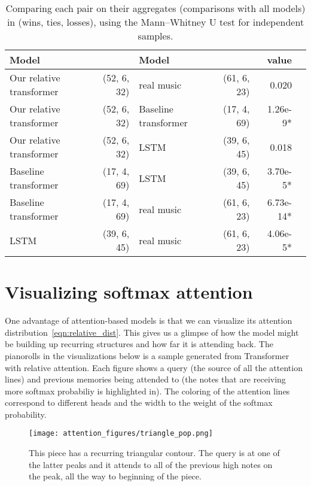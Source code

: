 \documentclass{article} \usepackage{iclr2019_conference,times}
\begin{document}
\begin{table}[h]
  \caption{Comparing each pair on their aggregates (comparisons with all models) in (wins, ties, losses), using the Mann–Whitney U test for independent samples.}
  \label{table:listening_aggregates}
  \centering
  \begin{tabular}{lrlrrl}
    \toprule
     Model     &  & Model &  &  value      \\
    \midrule
Our relative transformer & (52, 6, 32) &  real music & (61, 6, 23) & 0.020 \\
Our relative transformer & (52, 6, 32) & Baseline transformer & (17, 4, 69) & 1.26e-9*\\
Our relative transformer & (52, 6, 32) & LSTM  & (39, 6, 45) & 0.018\\
Baseline transformer & (17, 4, 69) & LSTM & (39, 6, 45) & 3.70e-5* \\
Baseline transformer & (17, 4, 69) & real music & (61, 6, 23) & 6.73e-14*\\
LSTM & (39, 6, 45) & real music & (61, 6, 23) & 4.06e-5*\\
  
    \bottomrule
  \end{tabular}
\end{table}





\newpage
\section{Visualizing softmax attention}
\label{vis}
One advantage of attention-based models is that we can visualize its attention distribution~\ref{eqn:relative_dist}.  This gives us a glimpse of how the model might be building up recurring structures and how far it is attending back.  
The pianorolls in the visualizations below is a sample generated from Transformer with relative attention.   
Each figure shows a query (the source of all the attention lines) and previous memories being attended to (the notes that are receiving more softmax probabiliy is highlighted in).  The coloring of the attention lines correspond to different heads and the width to the weight of the softmax probability.


\begin{figure}[H]
\vskip -0.1in
\begin{center}
\centerline{\texttt{[image: attention\_figures/triangle\_pop.png]}}
\caption{This piece has a recurring triangular contour.  The query is at one of the latter peaks and it attends to all of the previous high notes on the peak, all the way to beginning of the piece.}
\label{fig:triangle}
\end{center}
\vskip -0.1in
\end{figure}
\end{document}
